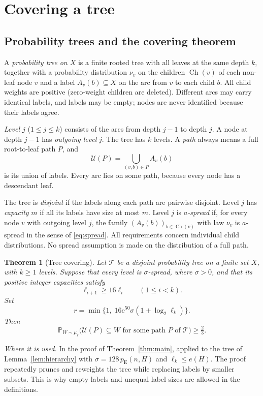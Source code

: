 \documentclass[11pt]{article}
\newtheorem{theorem}{Theorem}[section]
\numberwithin{equation}{section}
\theoremstyle{remark}
\newcommand{\PP}{\mathbb P}
\newcommand{\pE}{p_{\mathrm E}}
\newcommand{\TT}{\mathcal T}
\newcommand{\UU}{\mathcal U}
\newcommand{\ch}{\operatorname{Ch}}
\newcommand{\ee}{\mathrm e}
\begin{document}
\section{Covering a tree}\label{sec:trees}

\subsection{Probability trees and the covering theorem}

A \emph{probability tree on $X$} is a finite rooted tree with all leaves
at the same depth $k$, together with a probability distribution $\nu_v$
on the children $\ch(v)$ of each non-leaf node $v$ and a label
$A_v(b)\subseteq X$ on the arc from $v$ to each child $b$. All child
weights are positive (zero-weight children are deleted). Different arcs
may carry identical labels, and labels may be empty; nodes are never
identified because their labels agree.

\emph{Level $j$} ($1\le j\le k$) consists of the arcs from depth $j-1$
to depth $j$. A node at depth $j-1$ has \emph{outgoing level} $j$. The
tree has $k$ levels. A \emph{path} always means a full root-to-leaf
path $P$, and
\[
 \UU(P)=\bigcup_{(v,b)\in P}A_v(b)
\]
is its union of labels. Every arc lies on some path, because every node
has a descendant leaf.

The tree is \emph{disjoint} if the labels along each path are pairwise
disjoint. Level $j$ has \emph{capacity} $m$ if all its labels have size
at most $m$. Level $j$ is \emph{$a$-spread} if, for every node $v$ with
outgoing level $j$, the family $(A_v(b))_{b\in\ch(v)}$ with law $\nu_v$
is $a$-spread in the sense of \eqref{eq:spread}. All requirements
concern individual child distributions. No spread assumption is made on
the distribution of a full path.

\begin{theorem}[Tree covering]\label{thm:tree}
Let $\TT$ be a disjoint probability tree on a finite set $X$, with
$k\ge1$ levels. Suppose that every level is $\sigma$-spread, where
$\sigma>0$, and that its positive integer capacities satisfy
\[
 \ell_{i+1}\ge16\ell_i\qquad(1\le i<k).
\]
Set
\[
 r=\min\{1,\;16\ee^{50}\sigma(1+\log_2\ell_k)\}.
\]
Then
\[
 \PP_{W\sim\mu_r}
 \bigl(\UU(P)\subseteq W\text{ for some path }P\text{ of }\TT\bigr)
 \ge\tfrac23.
\]
\end{theorem}

\emph{Where it is used.} In the proof of Theorem~\ref{thm:main}, applied
to the tree of Lemma~\ref{lem:hierarchy} with $\sigma=128\,\pE(n,H)$ and
$\ell_k\le e(H)$. The proof repeatedly prunes and reweights the tree
while replacing labels by smaller subsets. This is why empty labels and
unequal label sizes are allowed in the definitions.
\end{document}
